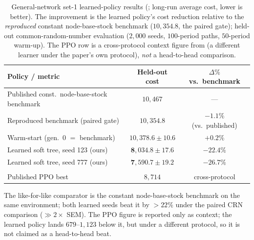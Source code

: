 \begin{table}[!htbp]
\centering
\caption{General-network set-1 learned-policy results (\citealp{geevers2024cardboard}; long-run average
cost, lower is better). The improvement is the learned policy's cost reduction relative to the
\emph{reproduced} constant node-base-stock benchmark ($10{,}354.8$, the paired gate); held-out
common-random-number evaluation ($2{,}000$ seeds, $100$-period paths, $50$-period warm-up). The PPO row
is a cross-protocol context figure from \citet{geevers2024cardboard} (a different learner under the
paper's own protocol), \emph{not} a head-to-head comparison.}
\label{tab:gbk-results}
\begin{tabular}{lcc}
\toprule
Policy / metric & Held-out cost & $\Delta\%$ vs.\ benchmark \\
\midrule
Published const.\ node-base-stock benchmark & $10{,}467$ & --- \\
Reproduced benchmark (paired gate) & $10{,}354.8$ & $-1.1\%$ (vs.\ published) \\
Warm-start (gen.\ 0 $=$ benchmark) & $10{,}378.6 \pm 10.6$ & $+0.2\%$ \\
Learned soft tree, seed 123 (ours) & $\mathbf{8{,}034.8 \pm 17.6}$ & $\mathbf{-22.4\%}$ \\
Learned soft tree, seed 777 (ours) & $\mathbf{7{,}590.7 \pm 19.2}$ & $\mathbf{-26.7\%}$ \\
\addlinespace[2pt]
\multicolumn{3}{l}{\footnotesize Cross-protocol context (not head-to-head):} \\
Published PPO best \citep{geevers2024cardboard} & $8{,}714$ & cross-protocol \\
\bottomrule
\end{tabular}
\par\medskip\footnotesize The like-for-like comparator is the constant node-base-stock benchmark on
the same environment; both learned seeds beat it by $>22\%$ under the paired CRN comparison
($\gg 2\times$ SEM). The PPO figure is reported only as context; the learned policy lands
$679$--$1{,}123$ below it, but under a different protocol, so it is not claimed as a head-to-head beat.
\end{table}
\FloatBarrier
